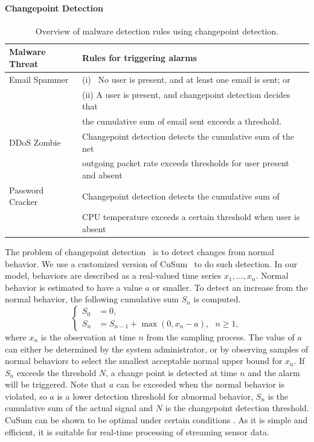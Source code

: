 \paragraph{Changepoint Detection}\label{subsec:changepoint}

\begin{table}[tb]
  \centering
  \begin{tabular}{|l|l|}
  \hline
  Malware Threat & Rules for triggering alarms \\
  \hline
  Email Spammer & (i) \ No user is present, and at least one email is sent; or \\
                & (ii) A user is present, and changepoint detection decides that \\
                & \hspace*{2em} the cumulative sum of email sent exceeds a threshold. \\
  \hline
  DDoS Zombie   & Changepoint detection detects the cumulative sum of the net \\
                & outgoing packet rate
        exceeds thresholds for user present and absent \\
  \hline
  Password Cracker & Changepoint detection detects the cumulative sum of \\
                   & CPU temperature exceeds a certain threshold
                   when user is absent  \\
  \hline
  \end{tabular}
  \caption{Overview of malware detection rules using changepoint detection. }\label{tbl:detect-malware}
\end{table}

The problem of changepoint detection~\cite{basseville1993detection} is to
detect changes from normal behavior.
We use a customized version of CuSum~\cite{page1954continuous} to do such
detection. In our model, behaviors are described as a real-valued
time series $x_1, \ldots, x_n$. Normal behavior is estimated to have a value
$a$ or smaller. To detect an
increase from the normal behavior,
the following cumulative sum $S_n$ is computed.
\begin{displaymath}
\left\{
\begin{aligned}
S_0 &= 0, \\
S_n &= S_{n-1} + \max(0, x_{n} - a), \ \ \ n \geq 1,
\end{aligned}
\right.
\end{displaymath}
\noindent where $x_n$ is the observation at time $n$ from the
sampling process. The value of $a$ can either be determined by the system
administrator, or by observing samples of normal behaviors to select
the smallest acceptable normal upper bound for $x_n$. If $S_n$
exceeds the threshold $N$, a change point is detected at time $n$
and the alarm will be triggered. Note that $a$ can be exceeded when
the normal behavior is violated, so $a$ is a lower detection threshold
for abnormal behavior, $S_n$ is the cumulative sum
of the actual signal and $N$ is the
changepoint detection threshold. CuSum can be shown to be optimal
under certain conditions \cite{basseville1993detection}. As it is simple
and efficient, it is suitable for real-time processing of streaming
sensor data.

